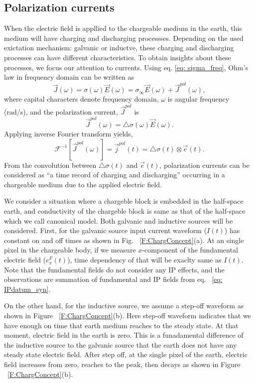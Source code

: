 \documentclass[letterpaper,11pt]{article}
\newcommand {\J}{{\vec J}}
\newcommand {\E}{{\vec E}}
\newcommand{\siginf}{\sigma_\infty}
\newcommand{\dsig}{\triangle\sigma}
\renewcommand {\j}  { {\vec j} }
\newcommand {\e}  { {\vec e} }
\begin{document}
\subsection{Polarization currents}
When the electric field is appllied to the chargeable medium in the earth, this medium will have charging and discharging processses. 
Depending on the used exictation mechanism: galvanic or inductve, these charging and discharging processes can have different characteristics. 
To obtain insights about these processes, we focus our attention to currents. Using eq. \ref{eq: sigma_freq}, Ohm's law in frequency domain can be written as 
\begin{equation}
	\J(\omega) = \sigma(\omega)\E(\omega)= \siginf\E(\omega) + \J^{pol}(\omega),
	\label{eq:OhmslawFreq}
\end{equation}
where capital characters denote frequency domain, $\omega$ is angular frequency (rad/s), and the polarization current, $\J^{pol}$ is 
\begin{equation}
	\J^{pol}(\omega) = \dsig(\omega)\E(\omega).
	\label{eq:JpolFreq}
\end{equation}
Applying inverse Fourier transform yields, 
\begin{equation}
	\mathcal{F}^{-1}[\J^{pol}(\omega)] = \j^{pol}(t) = \dsig(t)\otimes \e(t).
	\label{eq:polarization_current}
\end{equation}
From the convolution between $\dsig(t)$ and $\e(t)$, polarization currents can be considered as ``a time record of charging and discharging'' occurring in a chargeable medium due to the applied electric field. 

We consider a situation where a chargeble block is embedded in the half-space earth, and conductivity of the chargeble block is same as that of the half-space which we call canonical model. Both galvanic and inductive sources will be considered. First, for the galvanic source input current waveform ($I(t)$) has constant on and off times as shown in Fig. ~\ref{F:ChargConcept}(a). At an single pixel in the chargeable body, if we measure $x$-component of the fundamental electric field ($e_x^F(t)$), time dependency of that will be exaclty same as $I(t)$. Note that the fundamental fields do not consider any IP effects, and the observations are summation of fundamental and IP fields from eq. ~\ref{eq: IPdatum_syn}. 

On the other hand, for the inductive source, we assume a step-off waveform as shown in Figure ~\ref{F:ChargConcept}(b). Here step-off waveform indicates that we have enough on time that earth medium reaches to the steady state. At that moment, electric field in the earth is zero. This is a funadamental difference of the inductive source to the galvanic source that the earth does not have any steady state electric field. After step off, at the single pixel of the earth, electric field increases from zero, reaches to the peak, then decays as shown in Figure ~\ref{F:ChargConcept}(b).  
\end{document}
